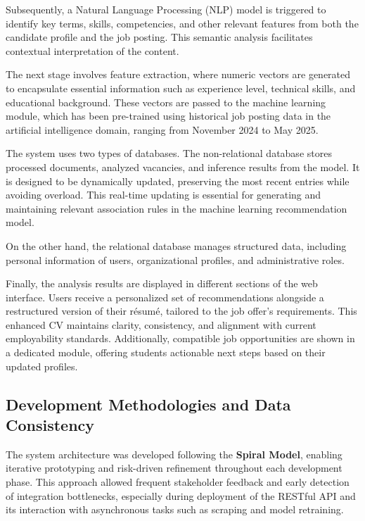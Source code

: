 \documentclass{svproc} %
\begin{document}
	Subsequently, a Natural Language Processing (NLP) model is triggered to identify key terms, skills, competencies, and other relevant features from both the candidate profile and the job posting. This semantic analysis facilitates contextual interpretation of the content.
	
	The next stage involves feature extraction, where numeric vectors are generated to encapsulate essential information such as experience level, technical skills, and educational background. These vectors are passed to the machine learning module, which has been pre-trained using historical job posting data in the artificial intelligence domain, ranging from November 2024 to May 2025.
	
	The system uses two types of databases. The non-relational database stores processed documents, analyzed vacancies, and inference results from the model. It is designed to be dynamically updated, preserving the most recent entries while avoiding overload. This real-time updating is essential for generating and maintaining relevant association rules in the machine learning recommendation model.
	
	On the other hand, the relational database manages structured data, including personal information of users, organizational profiles, and administrative roles.
	
	Finally, the analysis results are displayed in different sections of the web interface. Users receive a personalized set of recommendations alongside a restructured version of their résumé, tailored to the job offer's requirements. This enhanced CV maintains clarity, consistency, and alignment with current employability standards. Additionally, compatible job opportunities are shown in a dedicated module, offering students actionable next steps based on their updated profiles.
	
	\subsection{Development Methodologies and Data Consistency}
	
	The system architecture was developed following the \textbf{Spiral Model}, enabling iterative prototyping and risk-driven refinement throughout each development phase. This approach allowed frequent stakeholder feedback and early detection of integration bottlenecks, especially during deployment of the RESTful API and its interaction with asynchronous tasks such as scraping and model retraining.
	
\end{document}
